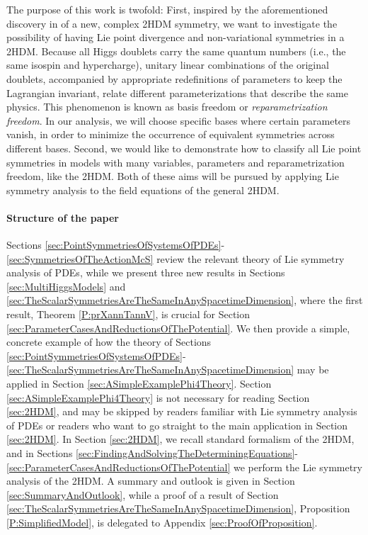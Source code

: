 \documentclass[a4paper,hidelinks, 12pt]{article}
\numberwithin{equation}{section}
\theoremstyle{plain}
\begin{document}
The purpose of this work is twofold: First, inspired by
the aforementioned discovery in \cite{Ferreira:2023dke} of a new, complex 2HDM symmetry,  
we want to investigate the possibility of having Lie point divergence and non-variational symmetries in a 2HDM. Because all Higgs doublets carry the same quantum numbers (i.e., the same isospin and hypercharge), unitary linear combinations of the original doublets, accompanied by appropriate redefinitions of parameters to keep the Lagrangian invariant, relate different parameterizations that describe the same physics. This phenomenon is known as basis freedom or \textit{reparametrization freedom}. In our analysis, we will choose specific bases where certain parameters vanish, in order to minimize the occurrence of equivalent symmetries across different bases.
Second, we would like to demonstrate how to classify 
all Lie point symmetries in models with many variables, parameters and reparametrization freedom, like the 2HDM. Both of these aims will be pursued by applying Lie symmetry analysis to the field equations of the general 2HDM.

 
		




\paragraph{Structure of the paper}
\label{sec:StructureOfThePaper}
Sections \ref{sec:PointSymmetriesOfSystemsOfPDEs}-\ref{sec:SymmetriesOfTheActionMcS} review the relevant theory of Lie symmetry analysis of PDEs, while we present three new results in Sections \ref{sec:MultiHiggsModels} and \ref{sec:TheScalarSymmetriesAreTheSameInAnySpacetimeDimension}, where the first result, Theorem \ref{P:prXannTannV}, is crucial for Section \ref{sec:ParameterCasesAndReductionsOfThePotential}. 
We then provide a simple, concrete example of how the theory of Sections \ref{sec:PointSymmetriesOfSystemsOfPDEs}-\ref{sec:TheScalarSymmetriesAreTheSameInAnySpacetimeDimension} may be applied in Section \ref{sec:ASimpleExamplePhi4Theory}. Section \ref{sec:ASimpleExamplePhi4Theory} is not necessary for
reading Section \ref{sec:2HDM}, and may be skipped by readers
familiar with Lie symmetry analysis of PDEs or readers who want to go straight to the main application in Section \ref{sec:2HDM}.
In Section 
  \ref{sec:2HDM}, we recall standard formalism of the 2HDM,
		and in Sections \ref{sec:FindingAndSolvingTheDeterminingEquations}-\ref{sec:ParameterCasesAndReductionsOfThePotential} we perform the Lie symmetry analysis of the 2HDM. A summary and outlook is given in Section \ref{sec:SummaryAndOutlook}, while a proof of a result of Section \ref{sec:TheScalarSymmetriesAreTheSameInAnySpacetimeDimension}, Proposition \ref{P:SimplifiedModel}, is delegated to Appendix \ref{sec:ProofOfProposition}.
\end{document}
